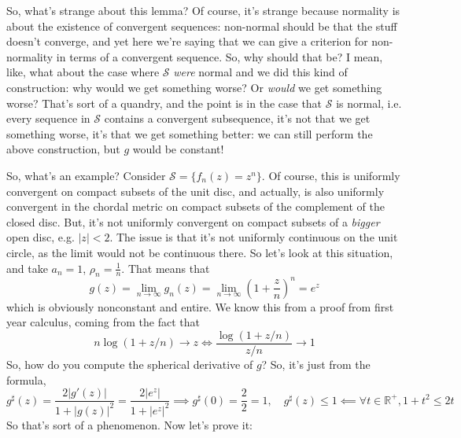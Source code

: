 \documentclass{article}
\newcommand{\mbb}[1]{\mathbb{#1}}
\newcommand{\mc}[1]{\mathcal{#1}}
\newcommand{\reals}{\mbb{R}}
\begin{document}
So, what's strange about this lemma? Of course, it's strange because normality is about the existence of convergent sequences: non-normal should be that the stuff doesn't converge, and yet here we're saying that we can give a criterion for non-normality in terms of a convergent sequence. So, why should that be? I mean, like, what about the case where \(\mc{S}\) \textit{were} normal and we did this kind of construction: why would we get something worse? Or \textit{would} we get something worse?
That's sort of a quandry, and the point is in the case that \(\mc{S}\) is normal, i.e. every sequence in \(\mc{S}\) contains a convergent subsequence, it's not that we get something worse, it's that we get something better: we can still perform the above construction, but \(g\) would be constant!

So, what's an example? Consider \(\mc{S} = \{f_n(z) = z^n\}\). Of course, this is uniformly convergent on compact subsets of the unit disc, and actually, is also uniformly convergent in the chordal metric on compact subsets of the complement of the closed disc. But, it's not uniformly convergent on compact subsets of a \textit{bigger} open disc, e.g. \(|z| < 2\). The issue is that it's not uniformly continuous on the unit circle, as the limit would not be continuous there. So let's look at this situation, and take \(a_n = 1\), \(\rho_n = \frac{1}{n}\). That means that
\begin{equation}g(z) = \lim_{n \to \infty}g_n(z) = \lim_{n \to \infty}\left(1 + \frac{z}{n}\right)^n = e^z\end{equation}
which is obviously nonconstant and entire. We know this from a proof from first year calculus, coming from the fact that
\begin{equation}n\log(1 + z/n) \to z \iff \frac{\log(1 + z/n)}{z/n} \to 1\end{equation}
So, how do you compute the spherical derivative of \(g\)? So, it's just from the formula,
\begin{equation}g^\sharp(z) = \frac{2|g'(z)|}{1 + |g(z)|^2} = \frac{2|e^z|}{1 + |e^z|^2} \implies g^\sharp(0) = \frac{2}{2} = 1, \quad g^\sharp(z) \leq 1 \impliedby \forall t \in \reals^+, 1 + t^2 \leq 2t\end{equation}
So that's sort of a phenomenon. Now let's prove it:
\end{document}
